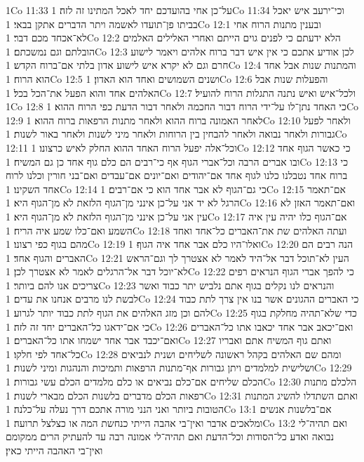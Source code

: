 1Co 11:33  על־כן אחי בהועדכם יחד לאכל המתינו זה לזה׃
1Co 11:34  וכי־ירעב איש יאכל בביתו פן־תועדו לאשמה ויתר הדברים אתקן בבאי׃
1Co 12:1  ובענין מתנות הרוח אחי לא־אכחד מכם דבר׃
1Co 12:2  הלא ידעתם כי לפנים גוים הייתם ואחרי האלילים האלמים הובלתם וגם נמשכתם׃
1Co 12:3  לכן אודיע אתכם כי אין איש דבר ברוח אלהים ויאמר לישוע חרם וגם לא יקרא איש לישוע אדון בלתי אם־ברוח הקדש׃
1Co 12:4  והמתנות שנות אבל אחד הוא הרוח׃
1Co 12:5  ושנים השמושים ואחד הוא האדון׃
1Co 12:6  והפעלות שנות אבל האלהים אחד והוא הפעל את־הכל בכל׃
1Co 12:7  ולכל־איש ואיש נתנה התגלות הרוח להועיל׃
1Co 12:8  כי האחד נתן־לו על־ידי הרוח דבור החכמה ולאחר דבור הדעת כפי הרוח ההוא׃
1Co 12:9  לאחר האמונה ברוח ההוא ולאחר מתנות הרפאות ברוח ההוא׃
1Co 12:10  ולאחר לפעל גבורות ולאחר נבואה ולאחר להבחין בין הרוחות ולאחר מיני לשנות ולאחר באור לשנות׃
1Co 12:11  וכל־אלה יפעל הרוח האחד ההוא החלק לאיש כרצונו׃
1Co 12:12  כי כאשר הגוף אחד ובו אברים הרבה וכל־אברי הגוף אף כי־רבים הם כלם גוף אחד כן גם המשיח׃
1Co 12:13  כי ברוח אחד נטבלנו כלנו לגוף אחד אם־יהודים ואם־יונים אם־עבדים ואם־בני חורין וכלנו לרוח אחד השקינו׃
1Co 12:14  כי גם־הגוף לא אבר אחד הוא כי אם־רבים׃
1Co 12:15  אם־תאמר הרגל לא יד אני על־כן אינני מן־הגוף הלזאת לא מן־הגוף היא׃
1Co 12:16  ואם־תאמר האזן לא עין אני על־כן אינני מן־הגוף הלזאת לא מן־הגוף היא׃
1Co 12:17  אם־הגוף כלו יהיה עין איה השמע ואם־כלו שמע איה הריח׃
1Co 12:18  ועתה האלהים שת את־האברים כל־אחד ואחד מהם בגוף כפי רצונו׃
1Co 12:19  ואלו־היו כלם אבר אחד איה הגוף׃
1Co 12:20  הנה רבים הם האברים והגוף אחד׃
1Co 12:21  העין לא־תוכל דבר אל־היד לאמר לא אצטרך לך וגם־הראש לא־יוכל דבר אל־הרגלים לאמר לא אצטרך לכן׃
1Co 12:22  כי להפך אברי הגוף הנראים רפים צריכים אנו להם ביותר׃
1Co 12:23  והנראים לנו נקלים בגוף אתם נלביש יתר כבוד ואשר לבשת לנו מרבים אנחנו את עדים׃
1Co 12:24  כי האברים ההגונים אשר בנו אין צרך לתת כבוד להם וכן מזג האלהים את הגוף לתת כבוד יותר לגרוע׃
1Co 12:25  כדי שלא־תהיה מחלקת בגוף כי אם־ידאגו כל־האברים יחד זה לזה׃
1Co 12:26  ואם־יכאב אבר אחד יכאבו אתו כל־האברים ואם־יכבד אבר אחד ישמחו אתו כל־האברים׃
1Co 12:27  ואתם גוף המשיח אתם ואבריו כל־אחד לפי חלקו׃
1Co 12:28  ומהם שם האלהים בקהל ראשונה לשליחים ושנית לנביאים ושלישית למלמדים ויתן גבורות אף־מתנות הרפאות ותמיכות והנהגות ומיני לשנות׃
1Co 12:29  הכלם שליחים אם־כלם נביאים או כלם מלמדים הכלם עשי גבורות׃
1Co 12:30  הלכלם מתנות רפאות הכלם מדברים בלשנות הכלם מבארי לשנות׃
1Co 12:31  ואתם השתדלו להשיג המתנות הטובות ביותר ואני הנני מורה אתכם דרך נעלה על־כלנה׃
1Co 13:1  אם־בלשנות אנשים ומלאכים אדבר ואין־בי אהבה הייתי כנחשת המה או כצלצל תרועה׃
1Co 13:2  ואם תהיה־לי נבואה ואדע כל־הסודות וכל־הדעת ואם תהיה־לי אמונה רבה עד להעתיק הרים ממקומם ואין־בי האהבה הייתי כאין׃
